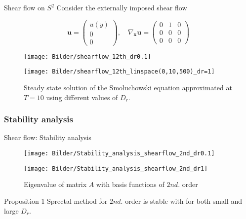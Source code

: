\begin{frame}{Shear flow on $S^2$}
	\scriptsize
	Consider the externally imposed shear flow 
	\begin{figure}
		\centering
		\begin{equation}
			\mathbf{u}=\begin{pmatrix}
				u(y) \\
				0 \\
				0
			\end{pmatrix}, \quad \nabla_{\mathbf{x}} \mathbf{u}=\begin{pmatrix}
				0 & 1 & 0 \\
				0 & 0 & 0 \\
				0 & 0 & 0
			\end{pmatrix}
		\end{equation}
	\end{figure}

\begin{figure}
	\small
	\begin{minipage}{0.43\textwidth}
		\texttt{[image: Bilder/shearflow\_12th\_dr0.1]}
	\end{minipage}
	\hfill 
	\begin{minipage}{0.43\textwidth}
		\texttt{[image: Bilder/shearflow\_12th\_linspace(0,10,500)\_dr=1]}
	\end{minipage}
	\caption{Steady state solution of the Smoluchowski equation approximated at $T = 10$ using different values of $D_r$.}
\end{figure}
\end{frame}

\subsubsection{Stability analysis}
\begin{frame}{Shear flow: Stability analysis}
	\begin{figure}
		\centering
		\begin{minipage}{0.4\linewidth}
			\texttt{[image: Bilder/Stability\_analysis\_shearflow\_2nd\_dr0.1]}
		\end{minipage}
		\hspace{1cm}
		\begin{minipage}{0.4\linewidth}
			\centering
			\texttt{[image: Bilder/Stability\_analysis\_shearflow\_2nd\_dr1]}
		\end{minipage}
		\caption{Eigenvalue of matrix $A$ with basis functions of $2nd.$ order}
	\end{figure}
	
	\begin{block}{Proposition 1}
		Sprectal method for $2nd.$ order is stable with for both small and large $D_r$.
	\end{block}
\end{frame}

